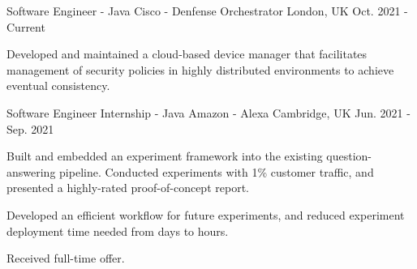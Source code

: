 

\begin{cventries}


\cventry
    {Software Engineer - Java} %
    {Cisco - Denfense Orchestrator} %
    {London, UK} %
    {Oct. 2021 - Current} %
    {
      \begin{cvitems} %
        \item {Developed and maintained a cloud-based device manager that facilitates management of security policies in highly distributed environments to achieve eventual consistency.}
      \end{cvitems}
    }

  \cventry
    {Software Engineer Internship - Java} %
    {Amazon - Alexa} %
    {Cambridge, UK} %
    {Jun. 2021 - Sep. 2021} %
    {
      \begin{cvitems} %
        \item {Built and embedded an experiment framework into the existing question-answering pipeline. Conducted experiments with 1\% customer traffic, and presented a highly-rated proof-of-concept report.}
        \item {Developed an efficient workflow for future experiments, and reduced experiment deployment time needed from days to hours.}
        \item {Received full-time offer.}
      \end{cvitems}
    }


\end{cventries}
